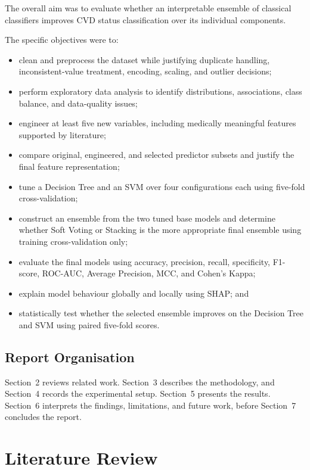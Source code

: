 \documentclass[11pt,a4paper]{article}
\begin{document}
The overall aim was to evaluate whether an interpretable ensemble of classical classifiers improves CVD status classification over its individual components.

The specific objectives were to:
\begin{itemize}
    \item clean and preprocess the dataset while justifying duplicate handling, inconsistent-value treatment, encoding, scaling, and outlier decisions;
    \item perform exploratory data analysis to identify distributions, associations, class balance, and data-quality issues;
    \item engineer at least five new variables, including medically meaningful features supported by literature;
    \item compare original, engineered, and selected predictor subsets and justify the final feature representation;
    \item tune a Decision Tree and an SVM over four configurations each using five-fold cross-validation;
    \item construct an ensemble from the two tuned base models and determine whether Soft Voting or Stacking is the more appropriate final ensemble using training cross-validation only;
    \item evaluate the final models using accuracy, precision, recall, specificity, F1-score, ROC-AUC, Average Precision, MCC, and Cohen's Kappa;
    \item explain model behaviour globally and locally using SHAP; and
    \item statistically test whether the selected ensemble improves on the Decision Tree and SVM using paired five-fold scores.
\end{itemize}

\subsection{Report Organisation}

Section~2 reviews related work. Section~3 describes the methodology, and Section~4 records the experimental setup. Section~5 presents the results. Section~6 interprets the findings, limitations, and future work, before Section~7 concludes the report.

\section{Literature Review}
\end{document}

